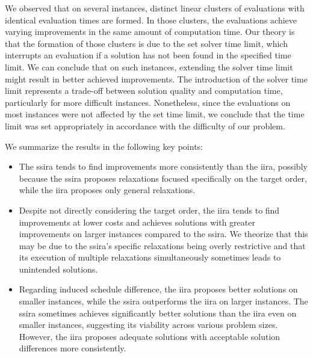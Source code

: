 We observed that on several instances,
distinct linear clusters of evaluations with identical evaluation times are formed.
In those clusters, the evaluations achieve varying improvements in the same amount of computation time.
Our theory is that the formation of those clusters is due to the set solver time limit,
which interrupts an evaluation if a solution has not been found in the specified time limit.
We can conclude that on such instances,
extending the solver time limit might result in better achieved improvements.
The introduction of the solver time limit represents a trade-off between solution quality and computation time,
particularly for more difficult instances.
Nonetheless, since the evaluations on most instances were not affected by the set time limit,
we conclude that the time limit was set appropriately in accordance with the difficulty of our problem.

We summarize the results in the following key points:
\begin{itemize}
    \item 
        The \ac{ssira} tends to find improvements more consistently than the \ac{iira},
        possibly because the \ac{ssira} proposes relaxations focused specifically on the target order,
        while the \ac{iira} proposes only general relaxations.

    \item
        Despite not directly considering the target order,
        the \ac{iira} tends to find improvements at lower costs
        and achieves solutions with greater improvements on larger instances compared to the \ac{ssira}.
        We theorize that this may be due to the \ac{ssira}'s specific relaxations being overly restrictive
        and that its execution of multiple relaxations simultaneously sometimes leads to unintended solutions.

    \item
        Regarding induced schedule difference,
        the \ac{iira} proposes better solutions on smaller instances,
        while the \ac{ssira} outperforms the \ac{iira} on larger instances.
        The \ac{ssira} sometimes achieves significantly better solutions than the \ac{iira}
        even on smaller instances, suggesting its viability across various problem sizes.
        However, the \ac{iira} proposes adequate solutions
        with acceptable solution differences more consistently.
\end{itemize}
